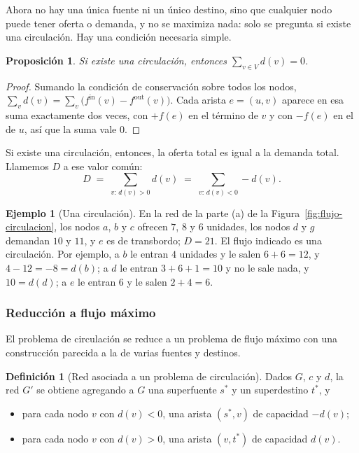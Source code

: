 \documentclass[12pt, spanish, oneside, openany]{book}
\theoremstyle{uprightplain}
\newtheorem{proposicion}[teorema]{Proposición}
\theoremstyle{definition}
\newtheorem{definicion}[teorema]{Definición}
\newtheorem{ejemplo}[teorema]{Ejemplo}
\theoremstyle{remark}
\theoremstyle{definition}
\begin{document}
Ahora no hay una única fuente ni un único destino, sino que cualquier nodo puede tener oferta o demanda, y no se maximiza nada: solo se pregunta si existe una circulación. Hay una condición necesaria simple.

\begin{proposicion}
\label{prop:flujo-circ-suma}
Si existe una circulación, entonces $\sum_{v\in V}d(v)=0$.
\end{proposicion}
\begin{proof}
Sumando la condición de conservación sobre todos los nodos, $\sum_v d(v)=\sum_v\bigl(f^{\mathrm{in}}(v)-f^{\mathrm{out}}(v)\bigr)$. Cada arista $e=(u,v)$ aparece en esa suma exactamente dos veces, con $+f(e)$ en el término de $v$ y con $-f(e)$ en el de $u$, así que la suma vale $0$.
\end{proof}

Si existe una circulación, entonces, la oferta total es igual a la demanda total. Llamemos $D$ a ese valor común:
\[
D\;=\;\sum_{v:\,d(v)>0}d(v)\;=\;\sum_{v:\,d(v)<0}-d(v).
\]

\begin{ejemplo}[Una circulación]
\label{ej:flujo-circulacion}
En la red de la parte (a) de la Figura~\ref{fig:flujo-circulacion}, los nodos $a$, $b$ y $c$ ofrecen $7$, $8$ y $6$ unidades, los nodos $d$ y $g$ demandan $10$ y $11$, y $e$ es de transbordo; $D=21$. El flujo indicado es una circulación. Por ejemplo, a $b$ le entran $4$ unidades y le salen $6+6=12$, y $4-12=-8=d(b)$; a $d$ le entran $3+6+1=10$ y no le sale nada, y $10=d(d)$; a $e$ le entran $6$ y le salen $2+4=6$.
\end{ejemplo}

\subsubsection{Reducción a flujo máximo}

El problema de circulación se reduce a un problema de flujo máximo con una construcción parecida a la de varias fuentes y destinos.

\begin{definicion}[Red asociada a un problema de circulación]
\label{def:flujo-red-circulacion}
Dados $G$, $c$ y $d$, la red $G'$ se obtiene agregando a $G$ una superfuente $s^{*}$ y un superdestino $t^{*}$, y
\begin{itemize}
    \item para cada nodo $v$ con $d(v)<0$, una arista $(s^{*},v)$ de capacidad $-d(v)$;
    \item para cada nodo $v$ con $d(v)>0$, una arista $(v,t^{*})$ de capacidad $d(v)$.
\end{itemize}
\end{definicion}
\end{document}
